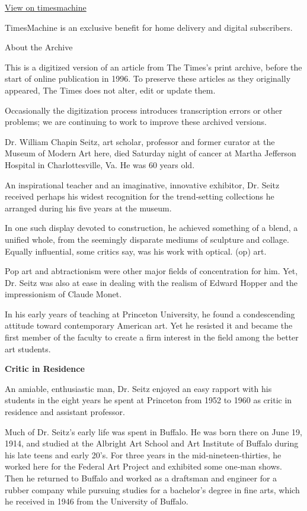\href{http://timesmachine.nytimes3xbfgragh.onion/timesmachine/1974/10/28/80432533.html}{View
on timesmachine}

TimesMachine is an exclusive benefit for home delivery and digital
subscribers.

About the Archive

This is a digitized version of an article from The Times's print
archive, before the start of online publication in 1996. To preserve
these articles as they originally appeared, The Times does not alter,
edit or update them.

Occasionally the digitization process introduces transcription errors or
other problems; we are continuing to work to improve these archived
versions.

Dr. William Chapin Seitz, art scholar, professor and former curator at
the Museum of Modern Art here, died Saturday night of cancer at Martha
Jefferson Hospital in Charlottesville, Va. He was 60 years old.

An inspirational teacher and an imaginative, innovative exhibitor, Dr.
Seitz received perhaps his widest recognition for the trend‐setting
collections he arranged during his five years at the museum.

In one such display devoted to construction, he achieved something of a
blend, a unified whole, from the seemingly disparate mediums of
sculpture and collage. Equally influential, some critics say, was his
work with optical. (op) art.

Pop art and abtractionism were other major fields of concentration for
him. Yet, Dr. Seitz was also at ease in dealing with the realism of
Edward Hopper and the impressionism of Claude Monet.

In his early years of teaching at Princeton University, he found a
condescending attitude toward contemporary American art. Yet he resisted
it and became the first member of the faculty to create a firm interest
in the field among the better art students.

\textbf{Critic in Residence}

An amiable, enthusiastic man, Dr. Seitz enjoyed an easy rapport with his
students in the eight years he spent at Princeton from 1952 to 1960 as
critic in residence and assistant professor.

Much of Dr. Seitz's early life was spent in Buffalo. He was born there
on June 19, 1914, and studied at the Albright Art School and Art
Institute of Buffalo during his late teens and early 20's. For three
years in the mid‐nineteen‐thirties, he worked here for the Federal Art
Project and exhibited some one‐man shows. Then he returned to Buffalo
and worked as a draftsman and engineer for a rubber company while
pursuing studies for a bachelor's degree in fine arts, which he received
in 1946 from the University of Buffalo.

